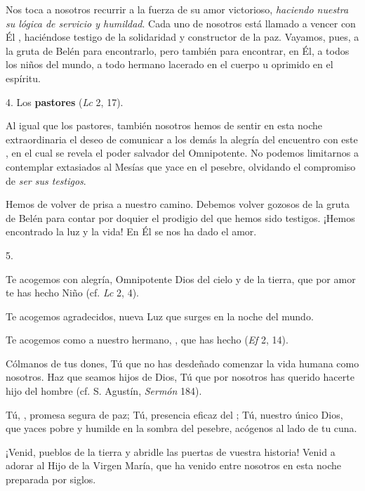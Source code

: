 \begin{body}
\begin{body}
Nos toca a nosotros recurrir a la fuerza de su amor victorioso, \emph{haciendo nuestra su lógica de servicio y humildad}. Cada uno de nosotros está llamado a vencer con Él , haciéndose testigo de la solidaridad y constructor de la paz. Vayamos, pues, a la gruta de Belén para encontrarlo, pero también para encontrar, en Él, a todos los niños del mundo, a todo hermano lacerado en el cuerpo u oprimido en el espíritu.

4. Los \textbf{pastores} \emph{} (\emph{Lc} 2, 17).

Al igual que los pastores, también nosotros hemos de sentir en esta noche extraordinaria el deseo de comunicar a los demás la alegría del encuentro con este \emph{}, en el cual se revela el poder salvador del Omnipotente. No podemos limitarnos a contemplar extasiados al Mesías que yace en el pesebre, olvidando el compromiso de \emph{ser sus testigos}.

Hemos de volver de prisa a nuestro camino. Debemos volver gozosos de la gruta de Belén para contar por doquier el prodigio del que hemos sido testigos. ¡Hemos encontrado la luz y la vida! En Él se nos ha dado el amor.

5. \emph{}

Te acogemos con alegría, Omnipotente Dios del cielo y de la tierra, que por amor te has hecho Niño \emph{} (cf. \emph{Lc} 2, 4).

Te acogemos agradecidos, nueva Luz que surges en la noche del mundo.

Te acogemos como a nuestro hermano, , que has hecho  (\emph{Ef} 2, 14).

Cólmanos de tus dones, Tú que no has desdeñado comenzar la vida humana como nosotros. Haz que seamos hijos de Dios, Tú que por nosotros has querido hacerte hijo del hombre (cf. S. Agustín, \emph{Sermón} 184).

Tú, , promesa segura de paz; Tú, presencia eficaz del ; Tú, nuestro único Dios, que yaces pobre y humilde en la sombra del pesebre, acógenos al lado de tu cuna.

¡Venid, pueblos de la tierra y abridle las puertas de vuestra historia! Venid a adorar al Hijo de la Virgen María, que ha venido entre nosotros en esta noche preparada por siglos.


\end{body}
\end{body}
